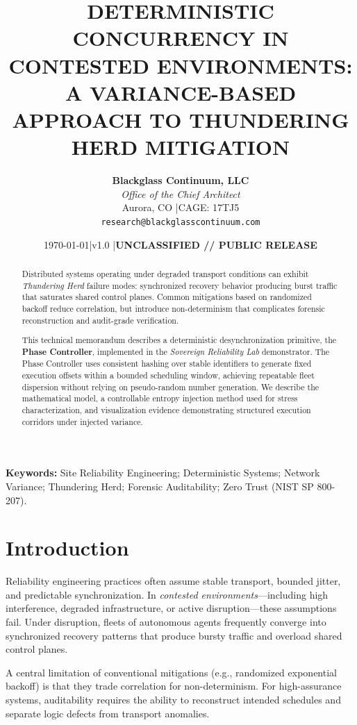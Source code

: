 \documentclass[10pt,twocolumn,letterpaper]{article}
\title{\textbf{\Large
DETERMINISTIC CONCURRENCY IN CONTESTED ENVIRONMENTS:\\
A VARIANCE-BASED APPROACH TO THUNDERING HERD MITIGATION
}}
\author{
\textbf{Blackglass Continuum, LLC}\\
\textit{Office of the Chief Architect}\\
Aurora, CO \quad|\quad CAGE: 17TJ5\\
\texttt{research@blackglasscontinuum.com}
}
\date{\today \quad|\quad v1.0 \quad|\quad \textbf{UNCLASSIFIED // PUBLIC RELEASE}}
\begin{document}
\maketitle

\begin{abstract}
\noindent Distributed systems operating under degraded transport conditions can exhibit \emph{Thundering Herd} failure modes: synchronized recovery behavior producing burst traffic that saturates shared control planes. Common mitigations based on randomized backoff reduce correlation, but introduce non-determinism that complicates forensic reconstruction and audit-grade verification.

This technical memorandum describes a deterministic desynchronization primitive, the \textbf{Phase Controller}, implemented in the \emph{Sovereign Reliability Lab} demonstrator. The Phase Controller uses consistent hashing over stable identifiers to generate fixed execution offsets within a bounded scheduling window, achieving repeatable fleet dispersion without relying on pseudo-random number generation. We describe the mathematical model, a controllable entropy injection method used for stress characterization, and visualization evidence demonstrating structured execution corridors under injected variance.
\end{abstract}

\vspace{0.4em}
\noindent \textbf{Keywords:} Site Reliability Engineering; Deterministic Systems; Network Variance; Thundering Herd; Forensic Auditability; Zero Trust (NIST SP 800-207).

\section{Introduction}
Reliability engineering practices often assume stable transport, bounded jitter, and predictable synchronization. In \textit{contested environments}---including high interference, degraded infrastructure, or active disruption---these assumptions fail. Under disruption, fleets of autonomous agents frequently converge into synchronized recovery patterns that produce bursty traffic and overload shared control planes.

A central limitation of conventional mitigations (e.g., randomized exponential backoff) is that they trade correlation for non-determinism. For high-assurance systems, auditability requires the ability to reconstruct intended schedules and separate logic defects from transport anomalies.
\end{document}
